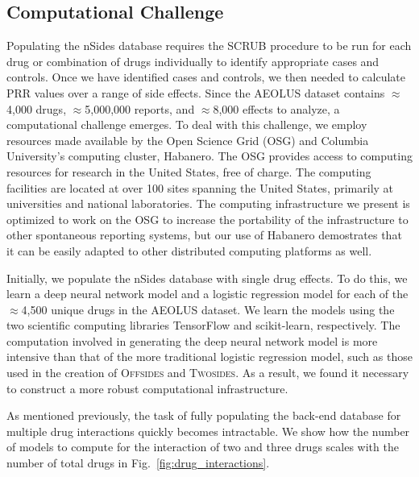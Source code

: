 \documentclass{ws-procs11x85}
\begin{document}
\subsection{Computational Challenge}

Populating the nSides database requires the SCRUB procedure to be run
for each drug or combination of drugs individually to identify
appropriate cases and controls. Once we have identified cases and
controls, we then needed to calculate PRR values over a range of side
effects. Since the AEOLUS dataset contains $\approx$4,000 drugs,
$\approx$5,000,000 reports, and $\approx$8,000 effects to analyze, a
computational challenge emerges.  To deal with this challenge, we
employ resources made available by the Open Science Grid (OSG) and
Columbia University's computing cluster, Habanero. The OSG provides
access to computing resources for research in the United States, free
of charge. The computing facilities are located at over 100 sites
spanning the United States, primarily at universities and national
laboratories. The computing infrastructure we present is optimized to
work on the OSG to increase the portability of the infrastructure to
other spontaneous reporting systems, but our use of Habanero
demostrates that it can be easily adapted to other distributed
computing platforms as well.

Initially, we populate the nSides database with single drug
effects. To do this, we learn a deep neural network model and a
logistic regression model for each of the $\approx$4,500 unique drugs
in the AEOLUS dataset. We learn the models using the two scientific
computing libraries TensorFlow and scikit-learn, respectively. The
computation involved in generating the deep neural network model is
more intensive than that of the more traditional logistic regression
model, such as those used in the creation of O\textsc{ffsides} and
T\textsc{wosides}. As a result, we found it necessary to construct a
more robust computational infrastructure.

As mentioned previously, the task of fully populating the back-end
database for multiple drug interactions quickly becomes
intractable. We show how the number of models to compute for the
interaction of two and three drugs scales with the number of total
drugs in Fig.~\ref{fig:drug_interactions}.
\end{document}
